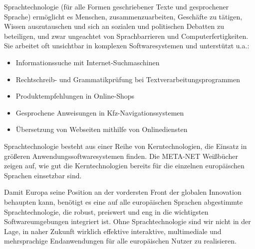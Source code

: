 \documentclass[]{../../metanetpaper}
\begin{document}
\begin{Parallel}[c]{79mm}{78mm}
{Sprachtechnologie (für alle Formen geschriebener Texte und gesprochener Sprache) ermöglicht es Menschen, zusammenzuarbeiten, Geschäfte zu tätigen, Wissen auszutauschen und sich an sozialen und politischen Debatten zu beteiligen, und zwar ungeachtet von Sprachbarrieren und Computerfertigkeiten. Sie arbeitet oft unsichtbar in komplexen Softwaresystemen und unterstützt u.a.:
    \begin{itemize}
      \item Informationssuche mit Internet-Suchmaschinen
      \item Rechtschreib- und Grammatikprüfung bei Textverarbeitungsprogrammen
      \item Produktempfehlungen in Online-Shops
      \item Gesprochene Anweisungen in Kfz-Na\-vi\-ga\-tions\-sys\-te\-men
      \item Übersetzung von Webseiten mithilfe von Onlinediensten
    \end{itemize}
Sprachtechnologie besteht aus einer Reihe von Kerntechnologien, die Einsatz in größeren Anwendungssoftwaresystemen finden. Die META-NET Weißbücher zeigen auf, wie gut die Kerntechnologien bereits für die einzelnen europäischen Sprachen einsetzbar sind. 

Damit Europa seine Position an der vordersten Front der globalen Innovation behaupten kann, benötigt es eine auf alle europäischen Sprachen abgestimmte Sprachtechnologie, die robust, preiswert und eng in die wichtigsten Softwareumgebungen integriert ist. Ohne Sprachtechnologie sind wir nicht in der Lage, in naher Zukunft wirklich effektive interaktive, multimediale und mehrsprachige Endanwendungen für alle europäischen Nutzer zu realisieren. 
  }

\end{Parallel}
\end{document}
